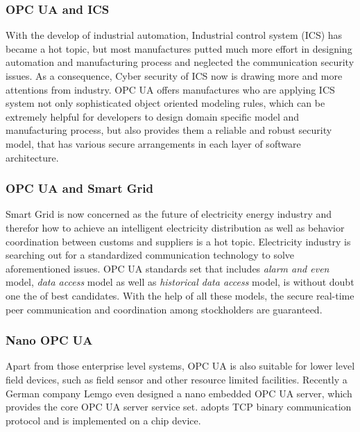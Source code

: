 \subsubsection{OPC UA and ICS}
With the develop of industrial automation, Industrial control system (ICS) has became a hot topic, but most manufactures putted much more effort in designing automation and manufacturing process and neglected the communication security issues. As a consequence, Cyber security of ICS now is drawing more and more attentions from industry. OPC UA offers manufactures who are applying ICS system not only sophisticated object oriented modeling rules, which can be extremely helpful for developers to design domain specific model and manufacturing process, but also provides them a reliable and robust security model\cite{opc_ics}, that has various secure arrangements in each layer of software architecture.


\subsubsection{OPC UA and  Smart Grid}
Smart Grid is now concerned as the future of electricity energy industry and therefor how to achieve an intelligent electricity distribution as well as behavior coordination between customs and suppliers is a hot topic\cite{opc_grid}. Electricity industry is searching out for a standardized communication technology to solve aforementioned issues.
OPC UA standards set that includes \emph{alarm and even} model, \emph{data access} model as well as  \emph{historical data access} model, is without doubt one the of best candidates. With the help of all these models, the secure real-time peer communication and coordination among stockholders are guaranteed.

\subsubsection{Nano OPC UA }
Apart from those enterprise level systems, OPC UA is also suitable for lower level field devices, such as field sensor and other resource limited facilities. Recently a German company Lemgo even designed a nano embedded OPC UA server\cite{opc_lemgo}, which provides the core OPC UA server service set. adopts TCP binary communication protocol and is implemented on a chip device.

